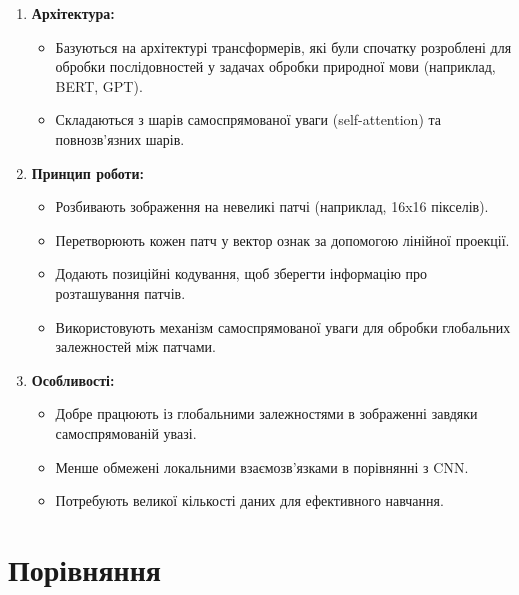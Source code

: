 \documentclass{udstu}
\begin{document}
\begin{enumerate}
    \item \textbf{Архітектура:}
    \begin{itemize}
        \item Базуються на архітектурі трансформерів, які були спочатку розроблені для обробки послідовностей у задачах обробки природної мови (наприклад, BERT, GPT).
        \item Складаються з шарів самоспрямованої уваги (self-attention) та повнозв'язних шарів.
    \end{itemize}

    \item \textbf{Принцип роботи:}
    \begin{itemize}
        \item Розбивають зображення на невеликі патчі (наприклад, 16x16 пікселів).
        \item Перетворюють кожен патч у вектор ознак за допомогою лінійної проекції.
        \item Додають позиційні кодування, щоб зберегти інформацію про розташування патчів.
        \item Використовують механізм самоспрямованої уваги для обробки глобальних залежностей між патчами.
    \end{itemize}

    \item \textbf{Особливості:}
    \begin{itemize}
        \item Добре працюють із глобальними залежностями в зображенні завдяки самоспрямованій увазі.
        \item Менше обмежені локальними взаємозв'язками в порівнянні з CNN.
        \item Потребують великої кількості даних для ефективного навчання.
    \end{itemize}
\end{enumerate}

\section*{Порівняння}
\end{document}

